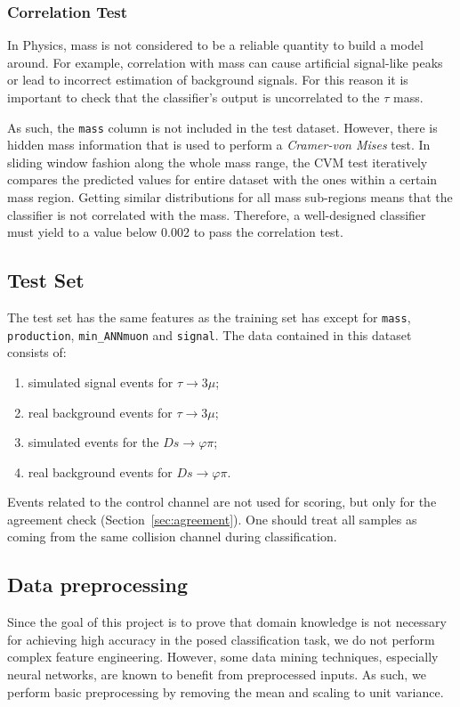 \documentclass[conference]{IEEEtran}
\begin{document}
\subsubsection{Correlation Test}
\label{sec:correlation}
In Physics, mass is not considered to be a reliable quantity to build a model around. For example, correlation with mass can cause artificial signal-like peaks or lead to incorrect estimation of background signals. For this reason it is important to check that the classifier's output is uncorrelated to the $\tau$ mass. 

As such, the \texttt{mass} column is not included in the test dataset. However, there is hidden mass information that is used to perform a \textit{Cramer-von Mises} test. In sliding window fashion along the whole mass range, the CVM test iteratively compares the predicted values for entire dataset with the ones within a certain mass region. Getting similar distributions for all mass sub-regions means that the classifier is not correlated with the mass. Therefore, a well-designed classifier must yield to a value below 0.002 to pass the correlation test.

\subsection{Test Set}
\label{sec:test-set}
The test set has the same features as the training set has except for
\texttt{mass}, \texttt{production}, \texttt{min\_ANNmuon} and \texttt{signal}.
The data contained in this dataset consists of:
\begin{enumerate}
	\item simulated signal events for $\tau \rightarrow 3\mu$;
	\item real background events for $\tau \rightarrow 3\mu$;
	\item simulated events for the $Ds \rightarrow \varphi\pi$;
	\item real background events for $Ds \rightarrow \varphi\pi$.
\end{enumerate}

Events related to the control channel are not used for scoring, but only for the
agreement check (Section~\ref{sec:agreement}). One should treat all samples as
coming from the same collision channel during classification.

\subsection{Data preprocessing}
Since the goal of this project is to prove that domain knowledge is not necessary for achieving high accuracy in the posed classification task, we do not perform complex feature engineering. However, some data mining techniques, especially neural networks, are known to benefit from preprocessed inputs. As such, we perform basic preprocessing by removing the mean and scaling to unit variance.
\end{document}
